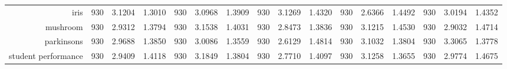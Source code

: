 \begin{table}[htbp]
{\begin{tabular}{rccccccccccccccc}
			iris                                & 930                                     & 3.1204                                                                    & 1.3010          & 930                            & 3.0968                                                                    & 1.3909          & 930                             & 3.1269                                                                             & 1.4320          & 930                             & \cellcolor[rgb]{ .776,  .937,  .808}\textcolor[rgb]{ 0,  .38,  0}{2.6366} & 1.4492          & 930                             & 3.0194                                                                    & 1.4352          \\
			mushroom                            & 930                                     & 2.9312                                                                    & 1.3794          & 930                            & 3.1538                                                                    & 1.4031          & 930                             & \cellcolor[rgb]{ .776,  .937,  .808}\textcolor[rgb]{ 0,  .38,  0}{2.8473}          & 1.3836          & 930                             & 3.1215                                                                    & 1.4530          & 930                             & 2.9032                                                                    & 1.4714          \\
			parkinsons                          & 930                                     & 2.9688                                                                    & 1.3850          & 930                            & 3.0086                                                                    & 1.3559          & 930                             & \cellcolor[rgb]{ .776,  .937,  .808}\textcolor[rgb]{ 0,  .38,  0}{2.6129}          & 1.4814          & 930                             & 3.1032                                                                    & 1.3804          & 930                             & 3.3065                                                                    & 1.3778          \\
			student performance                 & 930                                     & 2.9409                                                                    & 1.4118          & 930                            & 3.1849                                                                    & 1.3804          & 930                             & \cellcolor[rgb]{ .776,  .937,  .808}\textcolor[rgb]{ 0,  .38,  0}{2.7710}          & 1.4097          & 930                             & 3.1258                                                                    & 1.3655          & 930                             & 2.9774                                                                    & 1.4675          \\

\end{tabular}}
\end{table}
